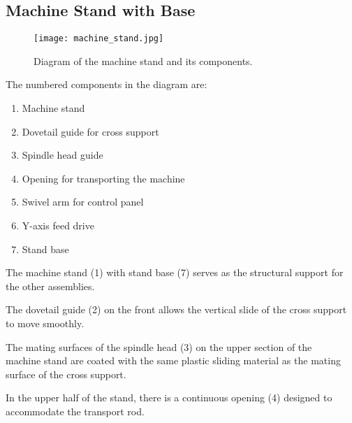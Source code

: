 

\subsection{Machine Stand with Base}

\begin{figure}[h]
    \centering
    \texttt{[image: machine\_stand.jpg]}
    \caption{Diagram of the machine stand and its components.}
    \label{fig:machine_stand}
\end{figure}

\noindent The numbered components in the diagram are:
\begin{enumerate}[itemsep=1pt,parsep=0pt]
    \item Machine stand
    \item Dovetail guide for cross support
    \item Spindle head guide
    \item Opening for transporting the machine
    \item Swivel arm for control panel
    \item Y-axis feed drive
    \item Stand base
\end{enumerate}

\noindent The machine stand (1) with stand base (7) serves as the structural support for the other assemblies.

\vspace{.3cm}

\noindent The dovetail guide (2) on the front allows the vertical slide of the cross support to move smoothly.

\vspace{.3cm}

\noindent The mating surfaces of the spindle head (3) on the upper section of the \\machine stand are coated with the same plastic sliding material as the mating surface of the cross support.

\vspace{.3cm}

\noindent In the upper half of the stand, there is a continuous opening (4) designed to accommodate the transport rod.

\vspace{.3cm}

